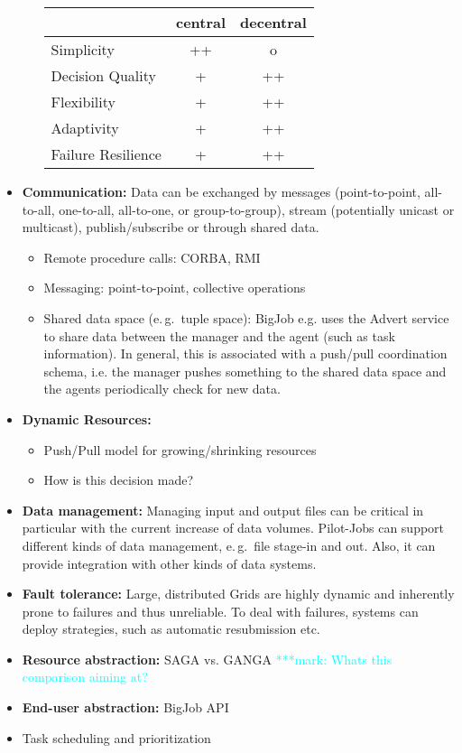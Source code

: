 \documentclass[]{article}
\newcommand{\msnote}[1]{ {\textcolor{cyan} { ***mark: #1 }}}
\begin{document}
\begin{itemize}
\begin{itemize}
			\begin{tabular}{|l|c|c|}
				\hline
				&central &decentral\\
				\hline
			Simplicity  &++			&o \\ \hline
			Decision Quality &+ 	&++ \\ \hline
			Flexibility &+			&++ \\ \hline
			Adaptivity  &+ 			&++ \\ \hline
			Failure Resilience &+   &++\\ \hline
			
			\end{tabular}

	\end{itemize}	
	\item \textbf{Communication:} Data can be exchanged by messages
(point-to-point, all-to-all, one-to-all, all-to-one, or group-to-group),
stream (potentially unicast or multicast), publish/subscribe or through shared
data.
	\begin{itemize}
		\item Remote procedure calls: CORBA, RMI
		\item Messaging: point-to-point, collective operations
		\item Shared data space (e.\,g.\ tuple space): BigJob e.g. uses the Advert service to share data between the manager and the agent (such as task information). In general, this is associated with a push/pull coordination schema, i.e. the manager pushes something to the shared data space and the agents periodically check for new data.
	\end{itemize} 
	\item \textbf{Dynamic Resources:}
		\begin{itemize}
			\item Push/Pull model for growing/shrinking resources
			\item How is this decision made?
		\end{itemize}
	\item \textbf{Data management:} Managing input and output files can be critical in particular with the current increase of data volumes. Pilot-Jobs can support different kinds of data management, e.\,g.\ file stage-in and out. Also, it can provide integration with other kinds of data systems.
	\item \textbf{Fault tolerance:} Large, distributed Grids are highly dynamic and inherently prone to failures and thus unreliable. To deal with failures, systems can deploy strategies, such as automatic resubmission etc.
	\item \textbf{Resource abstraction:} SAGA vs. GANGA
	\msnote{Whats this comparison aiming at?}
	\item \textbf{End-user abstraction:} BigJob API
	\item Task scheduling and prioritization


\end{itemize}
\end{document}
